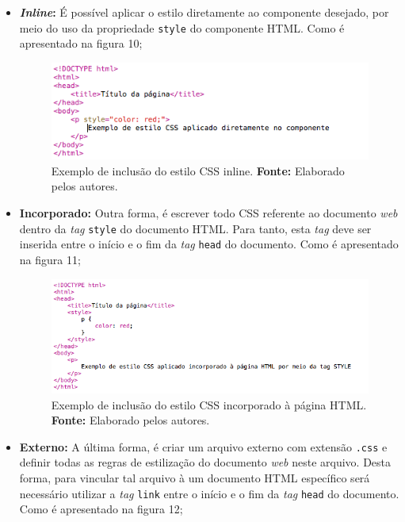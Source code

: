 \begin{itemize}
	\item \textbf{\textit{Inline}:} É possível aplicar o estilo diretamente ao componente desejado, por meio do uso da propriedade \texttt{style} do componente HTML. Como é apresentado na figura 10;
	
	\newpage
	\begin{figure}[h!]
		\centerline{\includegraphics[scale=0.8]{./imagens/example_css_inline.png}}
		\caption[Exemplo de inclusão do estilo CSS inline]
		{Exemplo de inclusão do estilo CSS inline. \textbf{Fonte:} Elaborado pelos autores.}
		\label{fig:exemplo1}
	\end{figure}
	
	\item \textbf{Incorporado:} Outra forma, é escrever todo CSS referente ao  documento \textit{web} dentro da \textit{tag} \texttt{style} do documento HTML. Para tanto, esta \textit{tag} deve ser inserida entre o início e o fim da \textit{tag} \texttt{head} do documento. Como é apresentado na figura 11;
	
	\begin{figure}[h!]
		\centerline{\includegraphics[scale=0.8]{./imagens/example_css_incorpored.png}}
		\caption[Exemplo de inclusão do estilo CSS incorporado à página HTML]
		{Exemplo de inclusão do estilo CSS incorporado à página HTML. \textbf{Fonte:} Elaborado pelos autores.}
		\label{fig:exemplo1}
	\end{figure}
	 
	\item \textbf{Externo:} A última forma, é criar um arquivo externo com extensão \texttt{.css} e definir todas as regras de estilização do documento \textit{web} neste arquivo. Desta forma, para vincular tal arquivo à um documento HTML específico será necessário utilizar a \textit{tag} \texttt{link} entre o início e o fim da \textit{tag} \texttt{head} do documento. Como é apresentado na figura 12;
	

\end{itemize}
